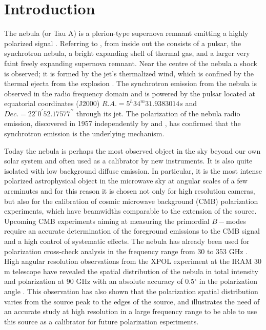 \documentclass[twocolumn,traditabstract]{aa}
\begin{document}
\section{Introduction}\label{sec:introduction}
The  nebula (or Tau A) is a plerion-type supernova remnant emitting a highly
polarized signal \citep{1978A&A....70..419W,1991ApJ...368..463M}.
Referring to \citet{2008ARA&A..46..127H}, from inside out the  consists of a pulsar, the synchrotron nebula, a bright expanding shell of thermal gas, and a larger very faint freely expanding supernova remnant.
Near the centre  of the nebula a shock is observed; it is formed by the jet's thermalized wind, which is confined by the thermal ejecta from the explosion \citep{2000ApJ...536L..81W,2011A&A...528A..11W}.
The synchrotron emission from the nebula is observed in the radio frequency domain and is  powered by the pulsar located at equatorial coordinates (J2000) $R.A. = 5^h34^m31.9383014s$ and $Dec. = 22^{\circ}0^{\prime}52.17577^{\prime\prime}$ \citep{Lobanov} through its jet.
The polarization of the  nebula radio emission, discovered in 1957 independently by \citet{1957ApJ...126..468M} and \citet{1959SvA.....3...39K}, has confirmed that the synchrotron emission is the underlying mechanism. 

Today the  nebula is perhaps the most observed object in the sky beyond our own solar system \citep{2008ARA&A..46..127H} and often used as a calibrator by new instruments. It is also quite isolated
with low background diffuse emission. In particular, it is the most intense polarized astrophysical object in the microwave sky
at angular scales of a few arcminutes and for this reason it is chosen not only for high resolution cameras,
but also for the calibration of
cosmic microwave background (CMB) polarization experiments, which have
beamwidths comparable to the extension of the source. 
Upcoming CMB experiments aiming at measuring the primordial $B-$modes require an accurate
determination of the foreground emissions to the CMB signal and a high control
of systematic effects.
The  nebula has already been used for polarization cross-check analysis in the frequency
range from 30 to 353 GHz \citep{2011ApJS..192...19W,2015arXiv150702058P}.
High angular resolution observations from the XPOL experiment \citep{thum2008} at the
IRAM 30 m telescope have revealed the spatial distribution of the  nebula  in
total intensity and polarization at 90 GHz with an absolute accuracy of 0.5$^{\circ}$
in the polarization angle \citep{aumont2010}.
This observation has also shown that the polarization spatial distribution varies from the source peak
to the edges of the source, and illustrates the need of an accurate study at high resolution in a large frequency range to be able to use this source as a calibrator for future polarization esperiments.
\end{document}
